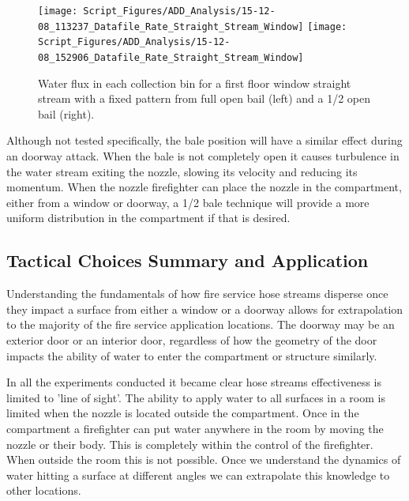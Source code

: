 \documentclass[12pt,oneside]{book}
\begin{document}
\begin{figure}[ht]
\texttt{[image: Script\_Figures/ADD\_Analysis/15-12-08\_113237\_Datafile\_Rate\_Straight\_Stream\_Window]}
\texttt{[image: Script\_Figures/ADD\_Analysis/15-12-08\_152906\_Datafile\_Rate\_Straight\_Stream\_Window]} \\ 
\caption[Water Flux Varying Bale Opening Straight Stream]{Water flux in each collection bin for a first floor window straight stream with a fixed pattern from full open bail (left) and a 1/2 open bail (right).}
\label{fig:SS_Window_First_Floor_Varying_Bail}
\end{figure}

Although not tested specifically, the bale position will have a similar effect during an doorway attack. When the bale is not completely open it causes turbulence in the water stream exiting the nozzle, slowing its velocity and reducing its momentum. When the nozzle firefighter can place the nozzle in the compartment, either from a window or doorway, a 1/2 bale technique will provide a more uniform distribution in the compartment if that is desired. 

\clearpage

\subsection{Tactical Choices Summary and Application}

Understanding the fundamentals of how fire service hose streams disperse once they impact a surface from either a window or a doorway allows for extrapolation to the majority of the fire service application locations. The doorway may be an exterior door or an interior door, regardless of how the geometry of the door impacts the ability of water to enter the compartment or structure similarly. 

In all the experiments conducted it became clear hose streams effectiveness is limited to 'line of sight'. The ability to apply water to all surfaces in a room is limited when the nozzle is located outside the compartment. Once in the compartment a firefighter can put water anywhere in the room by moving the nozzle or their body.  This is completely within the control of the firefighter.  When outside the room this is not possible.  Once we understand the dynamics of water hitting a surface at different angles we can extrapolate this knowledge to other locations.  
\end{document}
